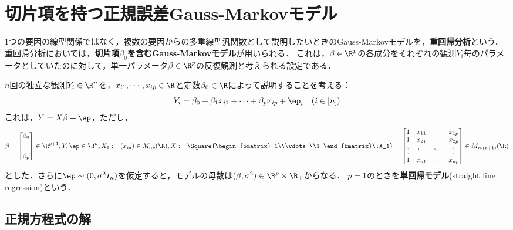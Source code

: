 \documentclass[uplatex,dvipdfmx]{jsreport}
\begin{document}
\section{切片項を持つ正規誤差Gauss-Markovモデル}

\begin{tcolorbox}[colframe=ForestGreen, colback=ForestGreen!10!white,breakable,colbacktitle=ForestGreen!40!white,coltitle=black,fonttitle=\bfseries\sffamily,
title=すなわち，線型重回帰モデルのことをいう]
    1つの要因の線型関係ではなく，複数の要因からの多重線型汎関数として説明したいときのGauss-Markovモデルを，\textbf{重回帰分析}という．
    重回帰分析においては，\textbf{切片項$\beta_0$を含むGauss-Markovモデル}が用いられる．
    これは，$\beta\in\R^p$の各成分をそれぞれの観測$Y_i$毎のパラメータとしていたのに対して，単一パラメータ$\beta\in\R^p$の反復観測と考えられる設定である．
\end{tcolorbox}

\begin{model}[線型重回帰モデル]
    $n$回の独立な観測$Y_i\in\R^n$を，$x_{i1},\cdots,x_{ip}\in\R$と定数$\beta_0\in\R$によって説明することを考える：
    \[Y_i=\beta_0+\beta_1x_{i1}+\cdots+\beta_px_{ip}+\ep_i\quad(i\in[n])\]
    これは，$Y=X\beta+\ep$，ただし，
    \[\beta=\begin{bmatrix}\beta_0\\\vdots\\\beta_p\end{bmatrix}\in\R^{p+1},Y,\ep\in\R^n,X_1:=(x_{ia})\in M_{np}(\R),X:=\Square{\begin{bmatrix}
        1\\\vdots\\1
    \end{bmatrix}\;X_1}=\begin{bmatrix}1&x_{11}&\cdots&x_{1p}\\1&x_{21}&\cdots&x_{2p}\\\vdots&\ddots&\ddots&\vdots\\1&x_{n1}&\cdots&x_{np}\end{bmatrix}\in M_{n,(p+1)}(\R)\]
    とした．さらに$\ep\sim(0,\sigma^2I_n)$を仮定すると，モデルの母数は$(\beta,\sigma^2)\in\R^p\times\R_+$からなる．
    $p=1$のときを\textbf{単回帰モデル}(straight line regression)という．
\end{model}

\subsection{正規方程式の解}
\end{document}

